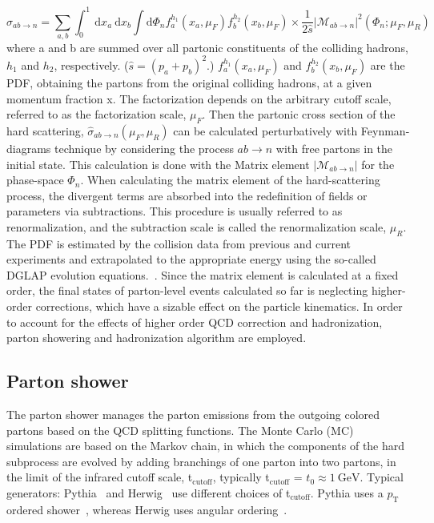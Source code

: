 \begin{equation}
\label{eqn:qcdxsec}
\sigma_{a b \rightarrow n}=\sum_{a, b} \int_{0}^{1} \mathrm{~d} x_{a} \mathrm{~d} x_{b} \int \mathrm{d} \Phi_{n} f_{a}^{h_{1}}\left(x_{a}, \mu_{F}\right) f_{b}^{h_{2}}\left(x_{b}, \mu_{F}\right) \times \frac{1}{2 \hat{s}}\left|\mathcal{M}_{a b \rightarrow n}\right|^{2}\left(\Phi_{n} ; \mu_{F}, \mu_{R}\right)
\end{equation}
where a and b are summed over all partonic constituents of the colliding hadrons, $h_1$ and $h_2$, respectively. ($\hat{s} = (p_a + p_b)^2$.)
$f_{a}^{h_{1}}\left(x_{a}, \mu_{F}\right)$ and $f_{b}^{h_{2}}\left(x_{b}, \mu_{F}\right)$ are the PDF, obtaining the partons from the original colliding hadrons, at a given momentum fraction x. The factorization depends on the arbitrary cutoff scale, referred to as the factorization scale, $\mu_F$.
Then the partonic cross section of the hard scattering, $\hat{\sigma}_{a b \rightarrow n}\left(\mu_{F}, \mu_{R}\right)$ can be calculated perturbatively with Feynman-diagrams technique by considering the process $ab\rightarrow n $ with free partons in the initial state. This calculation is done with the Matrix element $\left|\mathcal{M}_{a b \rightarrow n}\right|$ for the phase-space $\Phi_n$.
When calculating the matrix element of the hard-scattering process, the divergent terms are absorbed into the redefinition of fields or parameters via subtractions. This procedure is usually referred to as renormalization, and the subtraction scale is called the renormalization scale, $\mu_R$. 
The PDF is estimated by the collision data from previous and current experiments and extrapolated to the appropriate energy using the so-called DGLAP evolution equations.~\cite{https://doi.org/10.48550/arxiv.0802.0161}.
Since the matrix element is calculated at a fixed order, the final states of parton-level events calculated so far is neglecting higher-order corrections, which have a sizable effect on the particle kinematics. In order to account for the effects of higher order QCD correction and hadronization, parton showering and hadronization algorithm are employed.

\subsection{Parton shower}
\label{subsec:partonshower}
The parton shower manages the parton emissions from the outgoing colored partons based on the QCD splitting functions. 
The Monte Carlo (MC) simulations are based on the Markov chain, in which the components of the hard subprocess are evolved by adding branchings of one parton into two partons, in the limit of the infrared cutoff scale, t$_{\mathrm{cutoff}}$, typically t$_{\mathrm{cutoff}}$ = $t_{0} \approx 1~\mathrm{GeV}$. 
Typical generators: Pythia~\cite{SJOSTRAND2008852} and Herwig~\cite{Gieseke2012} use different choices of t$_{\mathrm{cutoff}}$.
Pythia uses a $p_\mathrm{T}$ ordered shower~\cite{PYTHIAorder}, whereas Herwig uses angular ordering~\cite{PhysRevD.76.094003}.
